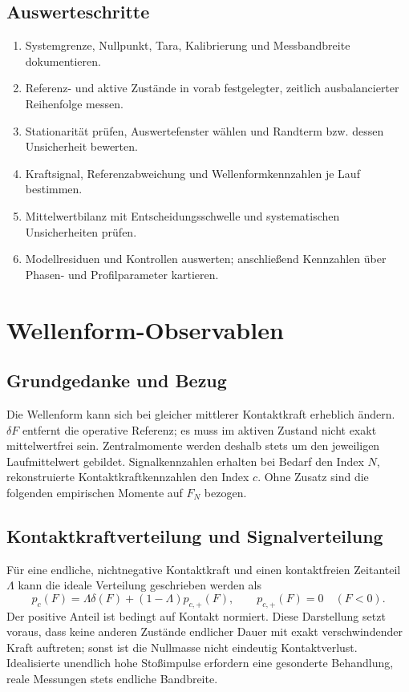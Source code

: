 \documentclass[11pt,a4paper]{article}
\begin{document}
\subsection{Auswerteschritte}
\begin{enumerate}
\item Systemgrenze, Nullpunkt, Tara, Kalibrierung und Messbandbreite dokumentieren.
\item Referenz- und aktive Zustände in vorab festgelegter, zeitlich ausbalancierter Reihenfolge messen.
\item Stationarität prüfen, Auswertefenster wählen und Randterm bzw. dessen Unsicherheit bewerten.
\item Kraftsignal, Referenzabweichung und Wellenformkennzahlen je Lauf bestimmen.
\item Mittelwertbilanz mit Entscheidungsschwelle und systematischen Unsicherheiten prüfen.
\item Modellresiduen und Kontrollen auswerten; anschließend Kennzahlen über Phasen- und Profilparameter kartieren.
\end{enumerate}

\section{Wellenform-Observablen}\label{sec:wellenform}
\subsection{Grundgedanke und Bezug}
Die Wellenform kann sich bei gleicher mittlerer Kontaktkraft erheblich ändern. $\delta F$ entfernt die operative Referenz; es muss im aktiven Zustand nicht exakt mittelwertfrei sein. Zentralmomente werden deshalb stets um den jeweiligen Laufmittelwert gebildet. Signalkennzahlen erhalten bei Bedarf den Index $N$, rekonstruierte Kontaktkraftkennzahlen den Index $c$. Ohne Zusatz sind die folgenden empirischen Momente auf $F_N$ bezogen.

\subsection{Kontaktkraftverteilung und Signalverteilung}
Für eine endliche, nichtnegative Kontaktkraft und einen kontaktfreien Zeitanteil $\Lambda$ kann die ideale Verteilung geschrieben werden als
\begin{equation}
p_c(F)=\Lambda\delta(F)+(1-\Lambda)p_{c,+}(F),\qquad p_{c,+}(F)=0\quad(F<0).
\label{eq:pdf}
\end{equation}
Der positive Anteil ist bedingt auf Kontakt normiert. Diese Darstellung setzt voraus, dass keine anderen Zustände endlicher Dauer mit exakt verschwindender Kraft auftreten; sonst ist die Nullmasse nicht eindeutig Kontaktverlust. Idealisierte unendlich hohe Stoßimpulse erfordern eine gesonderte Behandlung, reale Messungen stets endliche Bandbreite.
\end{document}
